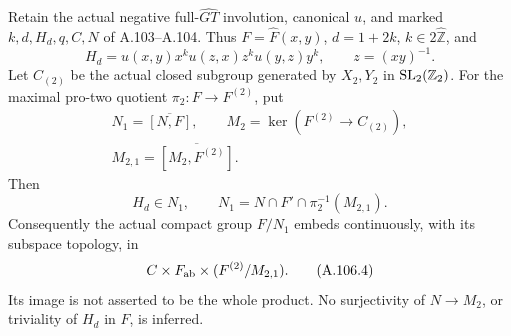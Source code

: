 Retain the actual negative full-\(\widehat{GT}\) involution,
canonical \(u\), and marked \(k,d,H_d,q,C,N\) of A.103--A.104.
Thus \(F=\widehat F(x,y)\), \(d=1+2k\), \(k\in2\widehat{\mathbb Z}\), and
\[
 H_d=u(x,y)x^k u(z,x)z^k u(y,z)y^k,\qquad z=(xy)^{-1}.
 \tag{A.106.1}
\]
Let \(C_{(2)}\) be the actual closed subgroup generated by \(X_2,Y_2\)
in \({\rm SL}_2(\mathbb Z_2)\). For the maximal pro-two quotient
\(\pi_2:F\to F^{(2)}\), put
\[
 \begin{gathered}
 N_1=\overline{[N,F]},\qquad
 M_2=\ker(F^{(2)}\to C_{(2)}),\\
 M_{2,1}=\overline{[M_2,F^{(2)}]}.
 \end{gathered}
 \tag{A.106.2}
\]
Then
\[
 \boxed{H_d\in N_1},\qquad
 \boxed{N_1=N\cap F'\cap\pi_2^{-1}(M_{2,1})}.
 \tag{A.106.3}
\]
Consequently the actual compact group \(F/N_1\) embeds continuously,
with its subspace topology, in
\[
 C\times F_{\rm ab}\times(F^{(2)}/M_{2,1}).
 \tag{A.106.4}
\]
Its image is not asserted to be the whole product. No surjectivity
of \(N\to M_2\), or triviality of \(H_d\) in \(F\), is inferred.

